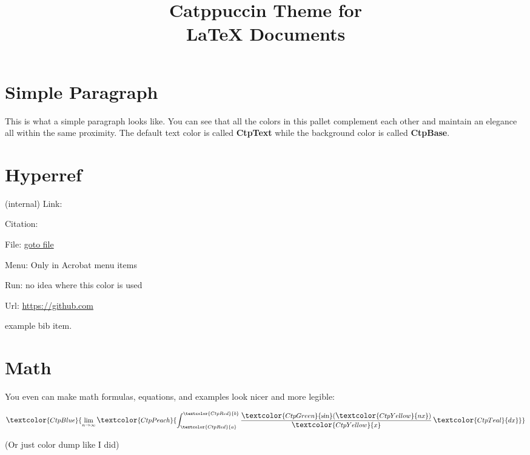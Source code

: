 \documentclass[12pt,a4paper]{article}
\title{ \Huge \textbf{\textcolor{CtpPink}{Catppuccin Theme for} \\ \textcolor{CtpLavender}{\LaTeX{} Documents}} \vspace{-3em}}
\date{}
\begin{document}
\maketitle

\section{\textcolor{CtpSky}{Simple Paragraph}}
\textcolor{CtpYellow}{This is what a simple paragraph looks like.} You can see that all the colors in this pallet complement each other and maintain an elegance all within the same proximity. The default text color is called \textbf{\textcolor{CtpGreen}{CtpText}} while the background color is called \textbf{\textcolor{CtpGreen}{CtpBase}}.

\begin{minipage}{0.47\linewidth}
	\section{\textcolor{CtpSky}{Hyperref}}
	(internal) Link: \pageref{l}

	Citation: \cite{bb}

	File: \href{file:///home/second_user}{goto file}

	Menu: Only in Acrobat menu items

	Run: no idea where this color is used

	Url: \url{https://github.com}

	\label{l}
	\begin{thebibliography}{2}
		 example bib item.
	\end{thebibliography}
\end{minipage}
\hfill\vline\hfill
\begin{minipage}{0.47\linewidth}
	\section{\textcolor{CtpSky}{Math}}

	You even can make math formulas, equations, and examples look nicer and more legible:


	\[\large{
		\textcolor{CtpBlue}{\lim_{{n \to \infty}} \textcolor{CtpPeach}{\int_{\textcolor{CtpRed}{a}}^{\textcolor{CtpRed}{b}} \frac{\textcolor{CtpGreen}{\sin}(\textcolor{CtpYellow}{nx})}{\textcolor{CtpYellow}{x}} \, \textcolor{CtpTeal}{dx}}}
	}\]

	\tiny{(Or just color dump like I did)}
\end{minipage}
\\
\end{document}
